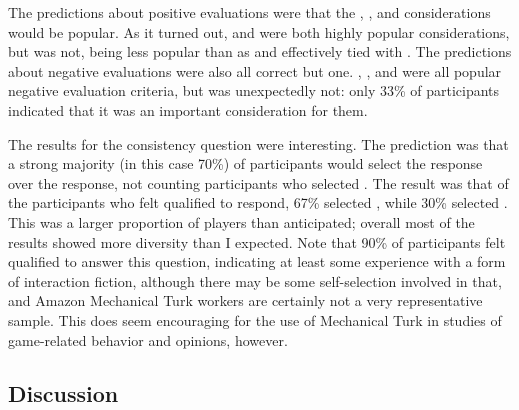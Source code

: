 The predictions about positive evaluations were that the , , and  considerations would be popular.
%
As it turned out,  and  were both highly popular considerations, but  was not, being less popular than as  and effectively tied with .
%
The predictions about negative evaluations were also all correct but one.
%
, , and  were all popular negative evaluation criteria, but  was unexpectedly not: only 33\% of participants indicated that it was an important consideration for them.


The results for the consistency question were interesting.
%
The prediction was that a strong majority (in this case 70\%) of participants would select the  response over the  response, not counting participants who selected .
%
The result was that of the participants who felt qualified to respond, 67\% selected , while 30\% selected .
%
This was a larger proportion of  players than anticipated; overall most of the results showed more diversity than I expected.
%
Note that 90\% of participants felt qualified to answer this question, indicating at least some experience with a form of interaction fiction, although there may be some self-selection involved in that, and Amazon Mechanical Turk workers are certainly not a very representative sample.
%
This does seem encouraging for the use of Mechanical Turk in studies of game-related behavior and opinions, however.


\subsection{Discussion}

\label{sec:e2-discussion}

